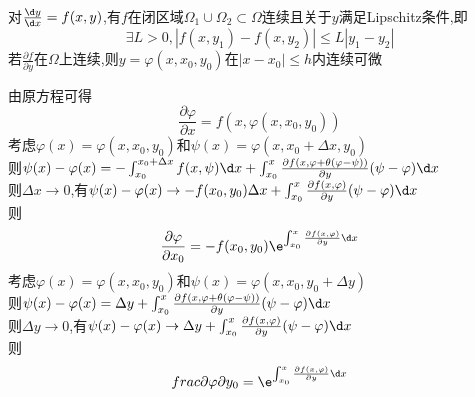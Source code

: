 \begin{dingli}
    对$\frac{\d y}{\d x}=f(x,y)$,有$f$在闭区域$\Omega_1\cup\Omega_2\subset\Omega$连续且关于$y$满足Lipschitz条件,即
    \[ \exists L>0,|f(x,y_1)-f(x,y_2)|\leqslant L|y_1-y_2|\]
    若$\frac{\partial f}{\partial y}$在$\Omega$上连续,则$y=\varphi(x,x_0,y_0)$在$|x-x_0|\leqslant h$内连续可微
\end{dingli}

\begin{zhu}
    由原方程可得\[\frac{\partial \varphi}{\partial x}=f(x,\varphi(x,x_0,y_0))\]
    考虑$\varphi(x)=\varphi(x,x_0,y_0)$和$\psi(x)=\varphi(x,x_0+\Delta x,y_0)$\\
    则$\psi(x)-\varphi(x)=-\int_{x_0}^{x_0+\Delta x}f(x,\psi)\d x+\int_{x_0}^{x}\frac{\partial f(x,\varphi+\theta(\varphi-\psi))}{\partial y}(\psi-\varphi)\d x$\\
    则$\Delta x\to 0$,有$\psi(x)-\varphi(x)\to -f(x_0,y_0)\Delta x+\int_{x_0}^{x}\frac{\partial f(x,\varphi)}{\partial y}(\psi-\varphi)\d x$\\
    则\[\frac{\partial \varphi}{\partial x_0}=-f(x_0,y_0)\e^{\int_{x_0}^{x}\frac{\partial f(x,\varphi)}{\partial y}\d x}\]
    考虑$\varphi(x)=\varphi(x,x_0,y_0)$和$\psi(x)=\varphi(x,x_0,y_0+\Delta y)$\\
    则$\psi(x)-\varphi(x)=\Delta y+\int_{x_0}^{x}\frac{\partial f(x,\varphi+\theta(\varphi-\psi))}{\partial y}(\psi-\varphi)\d x$\\
    则$\Delta y\to 0$,有$\psi(x)-\varphi(x)\to \Delta y+\int_{x_0}^{x}\frac{\partial f(x,\varphi)}{\partial y}(\psi-\varphi)\d x$\\
    则\[frac{\partial \varphi}{\partial y_0}=\e^{\int_{x_0}^{x}\frac{\partial f(x,\varphi)}{\partial y}\d x}\]
\end{zhu}

%